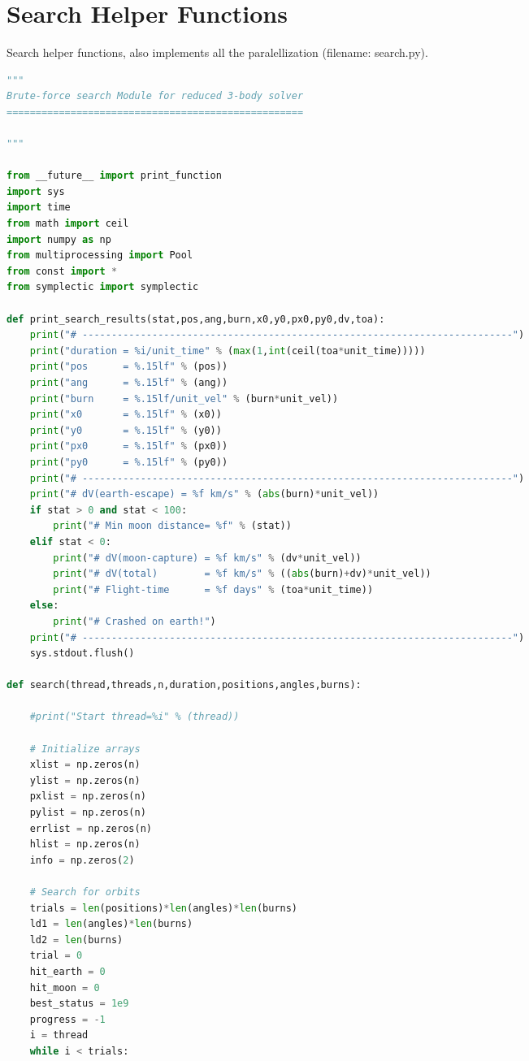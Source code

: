 \section{Search Helper Functions} \label{app:code-search}
Search helper functions, also implements all the paralellization (filename: search.py).
\begin{adjustwidth*}{0cm}{-0.4cm}
\begin{lstlisting}[language=Python]
"""
Brute-force search Module for reduced 3-body solver
===================================================

"""

from __future__ import print_function
import sys
import time
from math import ceil
import numpy as np
from multiprocessing import Pool
from const import *
from symplectic import symplectic

def print_search_results(stat,pos,ang,burn,x0,y0,px0,py0,dv,toa):
    print("# --------------------------------------------------------------------------")
    print("duration = %i/unit_time" % (max(1,int(ceil(toa*unit_time)))))
    print("pos      = %.15lf" % (pos))
    print("ang      = %.15lf" % (ang))
    print("burn     = %.15lf/unit_vel" % (burn*unit_vel))
    print("x0       = %.15lf" % (x0))
    print("y0       = %.15lf" % (y0))
    print("px0      = %.15lf" % (px0))
    print("py0      = %.15lf" % (py0))
    print("# --------------------------------------------------------------------------")
    print("# dV(earth-escape) = %f km/s" % (abs(burn)*unit_vel))
    if stat > 0 and stat < 100:
        print("# Min moon distance= %f" % (stat))
    elif stat < 0:
        print("# dV(moon-capture) = %f km/s" % (dv*unit_vel))
        print("# dV(total)        = %f km/s" % ((abs(burn)+dv)*unit_vel))
        print("# Flight-time      = %f days" % (toa*unit_time))
    else:
        print("# Crashed on earth!")
    print("# --------------------------------------------------------------------------")
    sys.stdout.flush()

def search(thread,threads,n,duration,positions,angles,burns):

    #print("Start thread=%i" % (thread))

    # Initialize arrays
    xlist = np.zeros(n)
    ylist = np.zeros(n)
    pxlist = np.zeros(n)
    pylist = np.zeros(n)
    errlist = np.zeros(n)
    hlist = np.zeros(n)
    info = np.zeros(2)

    # Search for orbits
    trials = len(positions)*len(angles)*len(burns)
    ld1 = len(angles)*len(burns)
    ld2 = len(burns)
    trial = 0
    hit_earth = 0
    hit_moon = 0
    best_status = 1e9
    progress = -1
    i = thread
    while i < trials:


\end{lstlisting}
\end{adjustwidth*}
